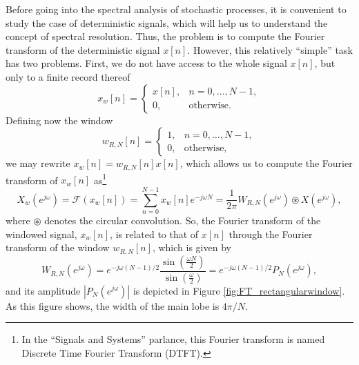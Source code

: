 Before going into the spectral analysis of stochastic processes, it is convenient to study the case of deterministic signals, which will help us to understand the concept of spectral resolution. Thus, the problem is to compute the Fourier transform of the deterministic signal $x[n]$. However, this relatively ``simple'' task has two problems. First, we do not have access to the whole signal $x[n]$, but only to a finite record thereof
\begin{equation*}
   x_w[n]  = \begin{cases}
   x[n], & n = 0, \ldots, N-1, \\
   0, & \text{otherwise.}
   \end{cases}
\end{equation*}
Defining now the window
\begin{equation*}
w_{R,N}[n]  = \begin{cases}
1, & n = 0, \ldots, N-1, \\
0, & \text{otherwise,}
\end{cases}
\end{equation*}
we may rewrite $x_w[n] = w_{R,N}[n] x[n]$, which allows us to compute the Fourier transform of $x_w[n]$ as\footnote{In the ``Signals and Systems'' parlance, this Fourier transform is named Discrete Time Fourier Transform (DTFT).}
\begin{equation}
\label{eq:DTFT}
X_w(e^{j \omega}) = \mathcal{F} \left(x_w[n]\right) = \sum_{n = 0}^{N-1} x_w[n] e^{- j \omega N} = \frac{1}{2 \pi} W_{R,N}(e^{j \omega}) \circledast X(e^{j \omega}),
\end{equation}
where $\circledast$ denotes the circular convolution. So, the Fourier transform of the windowed signal, $x_w[n]$, is related to that of $x[n]$ through the Fourier transform of the window $w_{R,N}[n]$, which is given by
\begin{equation*}
W_{R,N}(e^{j \omega}) = e^{-j \omega (N-1)/2} \frac{\sin\left(\frac{\omega N}{2}\right)}{\sin\left(\frac{\omega}{2}\right)} = e^{-j \omega (N-1)/2} P_N(e^{j \omega}),
\end{equation*}
and its amplitude $|P_N(e^{j \omega})|$ is depicted in Figure \ref{fig:FT_rectangularwindow}. As this figure shows, the width of the main lobe is $4 \pi/N$.

